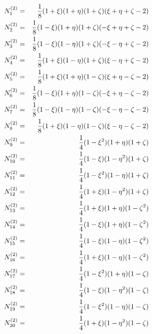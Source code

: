 \begin{eqnarray}
\label{bf3kn1}
N_{1}^{(2)} &=& \mbox{$\displaystyle\frac{1}{8}$} (1 + \xi) (1 + \eta) (1 + \zeta)
(\xi + \eta + \zeta - 2)
\\ \label{bf3kn2}
N_{2}^{(2)} &=& \mbox{$\displaystyle\frac{1}{8}$} (1 - \xi) (1 + \eta) (1 + \zeta)
(- \xi + \eta + \zeta - 2)
\\ \label{bf3kn3}
N_{3}^{(2)} &=& \mbox{$\displaystyle\frac{1}{8}$} (1 - \xi) (1 - \eta) (1 + \zeta)
(- \xi - \eta + \zeta - 2)
\\ \label{bf3kn4}
N_{4}^{(2)} &=& \mbox{$\displaystyle\frac{1}{8}$} (1 + \xi) (1 - \eta) (1 + \zeta)
(\xi - \eta + \zeta - 2)
\\ \label{bf3kn5}
N_{5}^{(2)} &=& \mbox{$\displaystyle\frac{1}{8}$} (1 + \xi) (1 + \eta) (1 - \zeta)
(\xi + \eta - \zeta - 2)
\\ \label{bf3kn6}
N_{6}^{(2)} &=& \mbox{$\displaystyle\frac{1}{8}$} (1 - \xi) (1 + \eta) (1 - \zeta)
(- \xi + \eta - \zeta - 2)
\\ \label{bf3kn7}
N_{7}^{(2)} &=& \mbox{$\displaystyle\frac{1}{8}$} (1 - \xi) (1 - \eta) (1 - \zeta)
(- \xi - \eta - \zeta - 2)
\\ \label{bf3kn8}
N_{8}^{(2)} &=& \mbox{$\displaystyle\frac{1}{8}$} (1 + \xi) (1 - \eta) (1 - \zeta)
(\xi - \eta - \zeta - 2)
\\ \label{bf3kn9}
N_{9}^{(2)} &=& \mbox{$\displaystyle\frac{1}{4}$} (1 - \xi^2) (1 + \eta) (1 + \zeta)
\\ \label{bf3kn10}
N_{10}^{(2)} &=& \mbox{$\displaystyle\frac{1}{4}$} (1 - \xi) (1 - \eta^2) (1 + \zeta)
\\ \label{bf3kn11}
N_{11}^{(2)} &=& \mbox{$\displaystyle\frac{1}{4}$} (1 - \xi^2) (1 - \eta) (1 + \zeta)
\\ \label{bf3kn12}
N_{12}^{(2)} &=& \mbox{$\displaystyle\frac{1}{4}$} (1 + \xi) (1 - \eta^2) (1 + \zeta)
\\ \label{bf3kn13}
N_{13}^{(2)} &=& \mbox{$\displaystyle\frac{1}{4}$} (1 + \xi) (1 + \eta) (1 - \zeta^2)
\\ \label{bf3kn14}
N_{14}^{(2)} &=& \mbox{$\displaystyle\frac{1}{4}$} (1 - \xi) (1 + \eta) (1 - \zeta^2)
\\ \label{bf3kn15}
N_{15}^{(2)} &=& \mbox{$\displaystyle\frac{1}{4}$} (1 - \xi) (1 - \eta) (1 - \zeta^2)
\\ \label{bf3kn16}
N_{16}^{(2)} &=& \mbox{$\displaystyle\frac{1}{4}$} (1 + \xi) (1 - \eta) (1 - \zeta^2)
\\ \label{bf3kn17}
N_{17}^{(2)} &=& \mbox{$\displaystyle\frac{1}{4}$} (1 - \xi^2) (1 + \eta) (1 - \zeta)
\\ \label{bf3kn18}
N_{18}^{(2)} &=& \mbox{$\displaystyle\frac{1}{4}$} (1 - \xi) (1 - \eta^2) (1 - \zeta)
\\ \label{bf3kn19}
N_{19}^{(2)} &=& \mbox{$\displaystyle\frac{1}{4}$} (1 - \xi^2) (1 - \eta) (1 - \zeta)
\\ \label{bf3kn20}
N_{20}^{(2)} &=& \mbox{$\displaystyle\frac{1}{4}$} (1 + \xi) (1 - \eta^2) (1 - \zeta)
\end{eqnarray}
